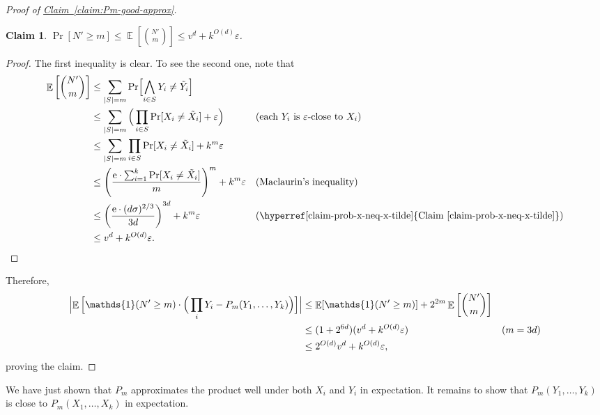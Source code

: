 \documentclass[11pt]{article}
\numberwithin{equation}{section}
\newtheorem{claim}[theorem]{Claim}
\theoremstyle{definition}
\theoremstyle{plain}
\newcommand{\eee}{\mathrm e}
\newcommand{\expref}[2]{\hyperref[#2]{#1~\ref{#2}}}
\def\eps{\varepsilon}
\def\1{\mathds{1}}
\DeclarePairedDelimiter{\abs}{\lvert}{\rvert}
\DeclareMathOperator*{\E}{\mathbb{E}}                 %
\begin{document}
\begin{proof} [Proof of {\expref{Claim}{claim:Pm-good-approx}}]
    \begin{claim} \label{claim-expect-of-binom}
      $\Pr[N' \ge m] \le \E \left[ {N' \choose m} \right] \le v^d + k^{O(d)} \eps$.
    \end{claim}

    \begin{proof} %
      The first inequality is clear.
      To see the second one, note that
      \begin{align*}
        \E \left[ {N' \choose m} \right]
        &\le \sum_{\abs{S} = m} \Pr\Bigl[ \bigwedge_{i \in S} Y_i \neq \tilde Y_i \Bigr] && \\
        &\le \sum_{\abs{S} = m} \Big( \prod_{i \in S} \Pr[ X_i \neq \tilde X_i ] + \eps \Big) && \text{(each $Y_i$ is $\eps$-close to $X_i$)} \\
        &\le \sum_{\abs{S} = m} \prod_{i \in S} \Pr[ X_i \neq \tilde X_i ] + k^m \eps &&\\
        &\le \left( \frac{\eee\cdot \sum_{i=1}^k \Pr[X_i \neq \tilde X_i] }{ m } \right)^m + k^m \eps &&  \text{(Maclaurin's inequality)} \\
        &\le \left( \frac{\eee\cdot (d \sigma)^{2/3} }{ 3d } \right)^{3d} + k^m \eps && \text{(\expref{Claim}{claim-prob-x-neq-x-tilde})}\\
        &\le v^d + k^{O(d)} \eps . &&  \qedhere
      \end{align*}
    \end{proof}
    Therefore,
    \begin{align*}
      \Bigl| \E \Big[\1(N' \ge m) \cdot \Big( \prod_i Y_i - P_m(Y_1, \ldots, Y_k) \Big) \Big] \Bigr|
      &\le \E[ \1(N' \ge m) ] + 2^{2m} \E \left[ \binom{N'}{m} \right] &&\\
      &\le (1 + 2^{6d}) ( v^d + k^{O(d)} \eps ) && (m = 3d) \\
      &\le 2^{O(d)} v^d + k^{O(d)} \eps , &&
    \end{align*}
    proving the claim.
  \end{proof}

  \medskip
  
  We have just shown that $P_m$ approximates the product well under both $X_i$ and $Y_i$ in expectation.
  It remains to show that $P_m(Y_1, \ldots, Y_k)$ is close to $P_m(X_1, \ldots, X_k)$ in expectation.
\end{document}
